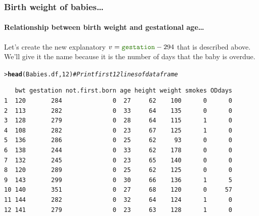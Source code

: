 \documentclass{beamer}\usepackage[]{graphicx}\usepackage[]{xcolor}
\makeatletter
\newcommand{\hlnum}[1]{\textcolor[rgb]{0.686,0.059,0.569}{#1}}%
\newcommand{\hlcom}[1]{\textcolor[rgb]{0.678,0.584,0.686}{\textit{#1}}}%
\newcommand{\hlstd}[1]{\textcolor[rgb]{0.345,0.345,0.345}{#1}}%
\newcommand{\hlkwd}[1]{\textcolor[rgb]{0.737,0.353,0.396}{\textbf{#1}}}%
\newenvironment{kframe}{%
 \def\at@end@of@kframe{}%
 \ifinner\ifhmode%
  \def\at@end@of@kframe{\end{minipage}}%
  \begin{minipage}{\columnwidth}%
 \fi\fi%
 \def\FrameCommand##1{\hskip\@totalleftmargin \hskip-\fboxsep
 \colorbox{shadecolor}{##1}\hskip-\fboxsep
     \hskip-\linewidth \hskip-\@totalleftmargin \hskip\columnwidth}%
 \MakeFramed {\advance\hsize-\width
   \@totalleftmargin\z@ \linewidth\hsize
   \@setminipage}}%
 {\par\unskip\endMakeFramed%
 \at@end@of@kframe}
\newenvironment{knitrout}{}{} %
\makeatother
\begin{document}
\begin{frame}[fragile]
\frametitle{Birth weight of babies\ldots}
\framesubtitle{Relationship between birth weight and gestational age\ldots}
Let's create the new explanatory $v = \rcode{gestation} - 294$ that is described above. We'll give it the name  because it is the number of days that the baby is overdue.

\begin{knitrout}\scriptsize
{}\color{fgcolor}\begin{kframe}
\begin{alltt}
\hlstd{> }\hlkwd{head}\hlstd{(Babies.df,}\hlnum{12}\hlstd{)} \hlcom{#Print first 12 lines of dataframe}
\end{alltt}
\begin{verbatim}
   bwt gestation not.first.born age height weight smokes ODdays
1  120       284              0  27     62    100      0      0
2  113       282              0  33     64    135      0      0
3  128       279              0  28     64    115      1      0
4  108       282              0  23     67    125      1      0
5  136       286              0  25     62     93      0      0
6  138       244              0  33     62    178      0      0
7  132       245              0  23     65    140      0      0
8  120       289              0  25     62    125      0      0
9  143       299              0  30     66    136      1      5
10 140       351              0  27     68    120      0     57
11 144       282              0  32     64    124      1      0
12 141       279              0  23     63    128      1      0
\end{verbatim}
\end{kframe}
\end{knitrout}
\end{frame}



\end{document}
